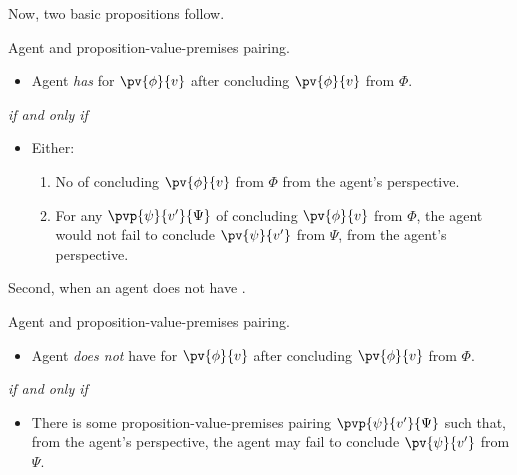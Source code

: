 \begin{note}
  Now, two basic propositions follow.

  \begin{proposition}
    Agent and proposition-value-premises pairing.

    \begin{itemize}
    \item
      Agent \emph{has} \zS{} for \(\pv{\phi}{v}\) after concluding \(\pv{\phi}{v}\) from \(\Phi\).
    \end{itemize}

    \emph{if and only if}

    \begin{itemize}
    \item
      Either:
      \begin{enumerate}[label=(\alph*), ref=\alph*]
      \item
        No  of concluding \(\pv{\phi}{v}\) from \(\Phi\) from the agent's perspective.
      \item
        For any \requ{} \(\pvp{\psi}{v'}{\Psi}\) of concluding \(\pv{\phi}{v}\) from \(\Phi\), the agent would not fail to conclude \(\pv{\psi}{v'}\) from \(\Psi\), from the agent's perspective.
      \end{enumerate}
    \end{itemize}
  \end{proposition}

  Second, when an agent does not have \zS{}.

  \begin{proposition}
    Agent and proposition-value-premises pairing.
    \begin{itemize}
    \item
      Agent \emph{does not} have \zS{} for \(\pv{\phi}{v}\) after concluding \(\pv{\phi}{v}\) from \(\Phi\).
    \end{itemize}

    \emph{if and only if}

    \begin{itemize}
    \item
      There is some proposition-value-premises pairing \(\pvp{\psi}{v'}{\Psi}\) such that, from the agent's perspective, the agent may fail to conclude \(\pv{\psi}{v'}\) from \(\Psi\).
    \end{itemize}
  \end{proposition}
\end{note}

